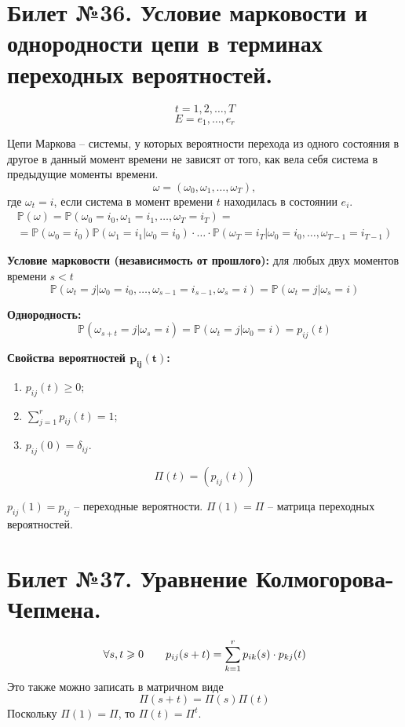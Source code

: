 \section{Билет №36. Условие марковости и однородности цепи в терминах переходных вероятностей.}

\[t = 1, 2, \ldots, T\]
\[E = {e_1, \ldots, e_r} \]

Цепи Маркова -- системы, у которых вероятности перехода из одного состояния в другое в данный момент времени не зависят от того, как вела себя система в предыдущие моменты времени.
\[\omega = (\omega_0, \omega_1, \ldots, \omega_T ),\]
где $\omega_t = i$, если система в момент времени $t$ находилась в состоянии $e_i$.
\begin{multline*}
	\mathbb{P}(\omega) = \mathbb{P}(\omega_0 = i_0, \omega_1 = i_1, \ldots, \omega_T = i_T) = \\ = \mathbb{P}(\omega_0 = i_0)  \mathbb{P}(\omega_1 = i_1 | \omega_0 = i_0) \cdot \ldots \cdot \mathbb{P}(\omega_T = i_T | \omega_0 = i_0, \ldots, \omega_{T-1} = i_{T-1})
\end{multline*}

\textbf{Условие марковости (независимость от прошлого):} для любых двух моментов времени $s<t$
\[\mathbb{P}(\omega_t = j | \omega_0 = i_0, \ldots, \omega_{s-1} = i_{s-1}, \omega_s = i) = \mathbb{P}(\omega_t = j | \omega_s = i) \]

\textbf{Однородность:}
\[\mathbb{P}(\omega_{s+t} = j | \omega_s = i) = \mathbb{P}(\omega_t = j | \omega_0 = i) = p_{ij}(t) \]

\textbf{Свойства вероятностей $\mathbf{p_{ij}(t)}$:}
\begin{enumerate}
    \item $p_{ij}(t) \geqslant 0$;
    \item $\sum\limits_{j=1}^{r} p_{ij}(t) = 1$;
    \item $p_{ij}(0) = \delta_{ij}$.
\end{enumerate}

\[\Pi(t) = (p_{ij}(t)) \]

$p_{ij}(1) = p_{ij}$ -- переходные вероятности. $\Pi(1) = \Pi$ -- матрица переходных вероятностей.

\section{Билет №37. Уравнение Колмогорова-Чепмена.}

\[\forall s, t \geqslant 0 \hspace*{2em} p_{ij}(s+t) = \sum_{k=1}^{r} p_{ik}(s) \cdot p_{kj}(t) \]
Это также можно записать в матричном виде
\[\Pi(s+t) = \Pi(s)\Pi(t) \]
Поскольку $\Pi(1) = \Pi$, то $\Pi(t) = \Pi^t$.

